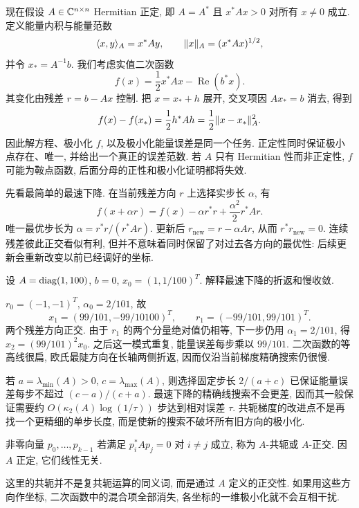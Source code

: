 \label{ch:cg}
现在假设 $A\in\mathbb C^{n\times n}$ Hermitian 正定, 即 $A=A^*$ 且 $x^*Ax>0$ 对所有 $x\ne0$ 成立. 定义能量内积与能量范数
\[
\langle x,y\rangle_A=x^*Ay,\qquad \lVert x\rVert_A=(x^*Ax)^{1/2},
\]
并令 $x_*=A^{-1}b$. 我们考虑实值二次函数
\[
f(x)=\frac12x^*Ax-\operatorname{Re}(b^*x).
\]
其变化由残差 $r=b-Ax$ 控制. 把 $x=x_*+h$ 展开, 交叉项因 $Ax_*=b$ 消去, 得到
\begin{equation}\label{eq:cg-quadratic-energy}
f(x)-f(x_*)=\frac12h^*Ah=\frac12\lVert x-x_*\rVert_A^2.
\end{equation}
因此解方程、极小化 $f$, 以及极小化能量误差是同一个任务. 正定性同时保证极小点存在、唯一, 并给出一个真正的误差范数. 若 $A$ 只有 Hermitian 性而非正定性, $f$ 可能为鞍点函数, 后面分母的正性和极小化证明都将失效.

先看最简单的最速下降. 在当前残差方向 $r$ 上选择实步长 $\alpha$, 有
\[
f(x+\alpha r)=f(x)-\alpha r^*r+\frac{\alpha^2}{2}r^*Ar.
\]
唯一最优步长为 $\alpha=r^*r/(r^*Ar)$. 更新后 $r_{\mathrm{new}}=r-\alpha Ar$, 从而 $r^*r_{\mathrm{new}}=0$. 连续残差彼此正交看似有利, 但并不意味着同时保留了对过去各方向的最优性: 后续更新会重新改变以前已经调好的坐标.

\begin{example}
设 $A=\operatorname{diag}(1,100)$, $b=0$, $x_0=(1,1/100)^T$. 解释最速下降的折返和慢收敛.
\end{example}
\begin{solution}
$r_0=(-1,-1)^T$, $\alpha_0=2/101$, 故
\[
x_1=(99/101,-99/10100)^T,\qquad
r_1=(-99/101,99/101)^T.
\]
两个残差方向正交. 由于 $r_1$ 的两个分量绝对值仍相等, 下一步仍用 $\alpha_1=2/101$, 得
$x_2=(99/101)^2x_0$. 之后这一模式重复, 能量误差每步乘以 $99/101$. 二次函数的等高线很扁, 欧氏最陡方向在长轴两侧折返, 因而仅沿当前梯度精确搜索仍很慢.
\end{solution}
若 $a=\lambda_{\min}(A)>0$, $c=\lambda_{\max}(A)$, 则选择固定步长 $2/(a+c)$ 已保证能量误差每步不超过 $(c-a)/(c+a)$. 最速下降的精确线搜索不会更差, 因而其一般保证需要约 $O(\kappa_2(A)\log(1/\tau))$ 步达到相对误差 $\tau$. 共轭梯度的改进点不是再找一个更精细的单步长度, 而是使新的搜索不破坏所有旧方向的极小化.

\begin{definition}
非零向量 $p_0,\ldots,p_{k-1}$ 若满足 $p_i^*Ap_j=0$ 对 $i\ne j$ 成立, 称为 $A$-共轭或 $A$-正交. 因 $A$ 正定, 它们线性无关.
\end{definition}
这里的共轭并不是复共轭运算的同义词, 而是通过 $A$ 定义的正交性. 如果用这些方向作坐标, 二次函数中的混合项全部消失, 各坐标的一维极小化就不会互相干扰.

